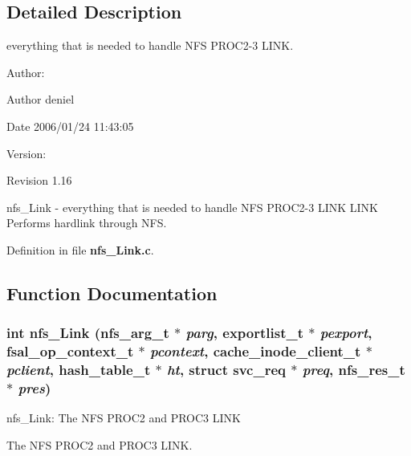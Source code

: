 \subsection{Detailed Description}
everything that is needed to handle NFS PROC2-3 LINK. 

\begin{Desc}
\item[Author:]\begin{Desc}
\item[Author]deniel \end{Desc}
\begin{Desc}
\item[Date]2006/01/24 11:43:05 \end{Desc}
\end{Desc}
\begin{Desc}
\item[Version:]\begin{Desc}
\item[Revision]1.16 \end{Desc}
\end{Desc}
nfs\_\-Link - everything that is needed to handle NFS PROC2-3 LINK LINK Performs hardlink through NFS.

Definition in file {\bf nfs\_\-Link.c}.

\subsection{Function Documentation}
\subsubsection{\setlength{\rightskip}{0pt plus 5cm}int nfs\_\-Link (nfs\_\-arg\_\-t $\ast$ {\em parg}, exportlist\_\-t $\ast$ {\em pexport}, fsal\_\-op\_\-context\_\-t $\ast$ {\em pcontext}, cache\_\-inode\_\-client\_\-t $\ast$ {\em pclient}, hash\_\-table\_\-t $\ast$ {\em ht}, struct svc\_\-req $\ast$ {\em preq}, nfs\_\-res\_\-t $\ast$ {\em pres})}\label{nfs__Link_8c_a0}


nfs\_\-Link: The NFS PROC2 and PROC3 LINK

The NFS PROC2 and PROC3 LINK.

